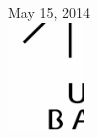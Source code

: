 \begin{titlepage}
\begin{center}
\vfill

{\large May 15, 2014} \\[1.5cm]



\includegraphics[width=0.15\textwidth]{figures/unilogoschwarz}~\\[1cm]
\end{center}
\end{titlepage}
